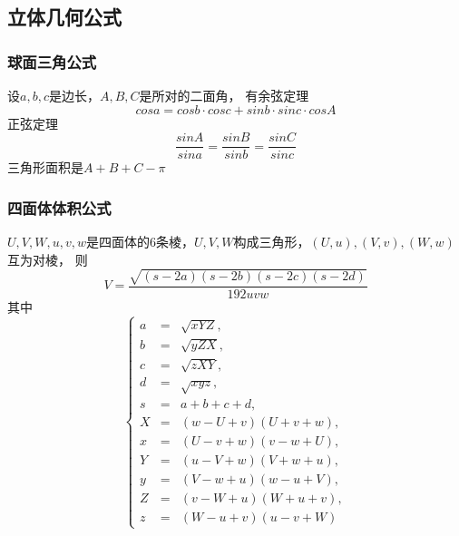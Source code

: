 \subsection{立体几何公式}
\subsubsection{球面三角公式}
	设$a, b, c$是边长，$A, B, C$是所对的二面角，
	有余弦定理$$cos a = cos b \cdot cos c + sin b \cdot sin c \cdot cos A$$
	正弦定理$$\frac{sin A}{sin a} = \frac{sin B}{sin b} = \frac{sin C}{sin c}$$
	三角形面积是$A + B + C - \pi$
\subsubsection{四面体体积公式}
	$U, V, W, u, v, w$是四面体的$6$条棱，$U, V, W$构成三角形，$(U, u), (V, v), (W, w)$互为对棱，
	则$$V = \frac{\sqrt{(s - 2a)(s - 2b)(s - 2c)(s - 2d)}}{192 uvw}$$
	其中$$\left\{\begin{array}{lll}
			a & = & \sqrt{xYZ}, \\
			b & = & \sqrt{yZX}, \\
			c & = & \sqrt{zXY}, \\
			d & = & \sqrt{xyz}, \\
			s & = & a + b + c + d, \\ 
			X & = & (w - U + v)(U + v + w), \\
			x & = & (U - v + w)(v - w + U), \\
			Y & = & (u - V + w)(V + w + u), \\
			y & = & (V - w + u)(w - u + V), \\
			Z & = & (v - W + u)(W + u + v), \\
			z & = & (W - u + v)(u - v + W)
		\end{array}\right.$$
